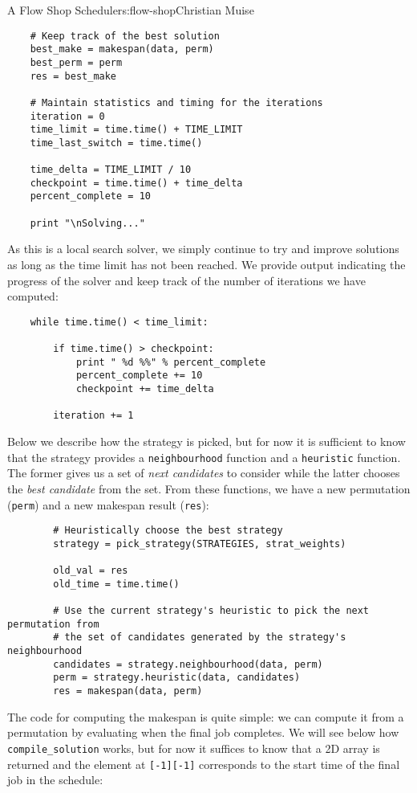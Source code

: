 \begin{aosachapter}{A Flow Shop Scheduler}{s:flow-shop}{Christian Muise}
\begin{verbatim}
    # Keep track of the best solution
    best_make = makespan(data, perm)
    best_perm = perm
    res = best_make

    # Maintain statistics and timing for the iterations
    iteration = 0
    time_limit = time.time() + TIME_LIMIT
    time_last_switch = time.time()

    time_delta = TIME_LIMIT / 10
    checkpoint = time.time() + time_delta
    percent_complete = 10

    print "\nSolving..."
\end{verbatim}

As this is a local search solver, we simply continue to try and improve
solutions as long as the time limit has not been reached. We provide
output indicating the progress of the solver and keep track of the
number of iterations we have computed:

\begin{verbatim}
    while time.time() < time_limit:

        if time.time() > checkpoint:
            print " %d %%" % percent_complete
            percent_complete += 10
            checkpoint += time_delta

        iteration += 1
\end{verbatim}

Below we describe how the strategy is picked, but for now it is
sufficient to know that the strategy provides a \texttt{neighbourhood}
function and a \texttt{heuristic} function. The former gives us a set of
\emph{next candidates} to consider while the latter chooses the
\emph{best candidate} from the set. From these functions, we have a new
permutation (\texttt{perm}) and a new makespan result (\texttt{res}):

\begin{verbatim}
        # Heuristically choose the best strategy
        strategy = pick_strategy(STRATEGIES, strat_weights)

        old_val = res
        old_time = time.time()

        # Use the current strategy's heuristic to pick the next permutation from
        # the set of candidates generated by the strategy's neighbourhood
        candidates = strategy.neighbourhood(data, perm)
        perm = strategy.heuristic(data, candidates)
        res = makespan(data, perm)
\end{verbatim}

The code for computing the makespan is quite simple: we can compute it
from a permutation by evaluating when the final job completes. We will
see below how \texttt{compile\_solution} works, but for now it suffices
to know that a 2D array is returned and the element at
\texttt{{[}-1{]}{[}-1{]}} corresponds to the start time of the final job
in the schedule:


\end{aosachapter}
